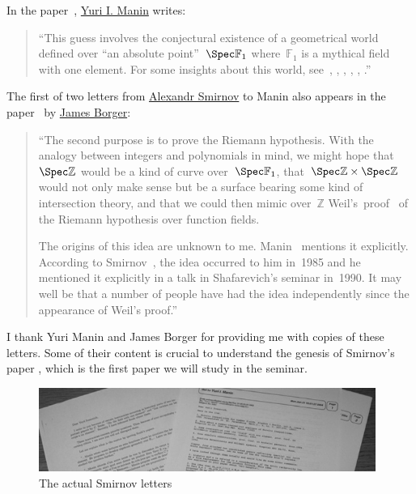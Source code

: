 In the paper~\cite{the-notion-of-dimension-in-geometry-and-algebra}, \href{http://en.wikipedia.org/wiki/Yuri_I._Manin}{Yuri I. Manin} writes:

\begin{quote}
  ``This guess involves the conjectural existence of a geometrical world defined over ``an absolute point''~$\Spec\mathbb{F}_1$ where~$\mathbb{F}_1$ is a mythical field with one element. For some insights about this world, see~\cite{sur-les-analogues-algebriques-des-groupes-semi-simples-complexes}, \cite{hurwitz-inequalities-for-number-fields}, \cite{letters-to-manin}, \cite{cohomology-determinants-and-reciprocity-laws}, \cite{three-dimensional-hyperbolic-geometry}, \cite{les-varietes-sur-le-corps-a-un-element}.''
\end{quote}

The first of two letters from \href{http://www.pdmi.ras.ru/eng/perso/smirnov.php}{Alexandr Smirnov} to Manin also appears in the paper~\cite{lambda-rings-and-the-field-with-one-element} by \href{http://maths.anu.edu.au/~borger/}{James Borger}:

\begin{quote}
  ``The second purpose is to prove the Riemann hypothesis. With the analogy between integers and polynomials in mind, we might hope that~$\Spec\mathbb{Z}$ would be a kind of curve over~$\Spec\mathbb{F}_1$, that~$\Spec\mathbb{Z}\times\Spec\mathbb{Z}$ would not only make sense but be a surface bearing some kind of intersection theory, and that we could then mimic over~$\mathbb{Z}$ Weil's~proof~\cite{on-the-riemann-hypothesis-in-function-fields} of the Riemann hypothesis over function fields.
  
  The origins of this idea are unknown to me. Manin~\cite{lectures-on-zeta-functions-and-motives} mentions it explicitly. According to Smirnov~\cite{letters-to-manin}, the idea occurred to him in~1985 and he mentioned it explicitly in a talk in Shafarevich's seminar in~1990. It may well be that a number of people have had the idea independently since the appearance of Weil's proof.''
\end{quote}

I thank Yuri Manin and James Borger for providing me with copies of these letters. Some of their content is crucial to understand the genesis of Smirnov's paper \cite{hurwitz-inequalities-for-number-fields}, which is the first paper we will study in the seminar.

\begin{figure}[ht!]
  \centering
  \includegraphics[width=11cm]{the-smirnov-letters/letters}
  \caption{The actual Smirnov letters}
  \label{figure:smirnov-letters}
\end{figure}

